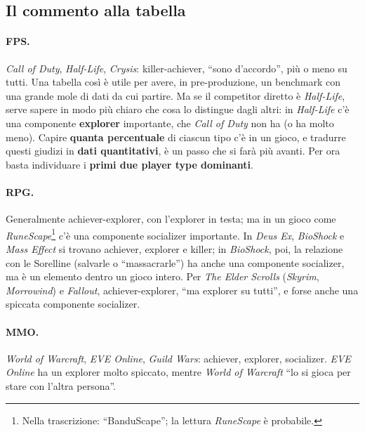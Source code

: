 \subsection{Il commento alla tabella}

\paragraph{FPS.} \emph{Call of Duty}, \emph{Half-Life}, \emph{Crysis}:
killer-achiever, ``sono d'accordo'', più o meno su tutti. Una tabella così è utile
per avere, in pre-produzione, un benchmark con una grande mole di dati da cui
partire. Ma se il competitor diretto è \emph{Half-Life}, serve sapere in modo più
chiaro che cosa lo distingue dagli altri: in \emph{Half-Life} c'è una componente
\textbf{explorer} importante, che \emph{Call of Duty} non ha (o ha molto meno).
Capire \textbf{quanta percentuale} di ciascun tipo c'è in un gioco, e tradurre questi
giudizi in \textbf{dati quantitativi}, è un passo che si farà più avanti. Per ora
basta individuare i \textbf{primi due player type dominanti}.

\paragraph{RPG.} Generalmente achiever-explorer, con l'explorer in testa; ma in un
gioco come \emph{RuneScape}\footnote{Nella trascrizione: ``BanduScape''; la lettura
\emph{RuneScape} è probabile.} c'è una componente socializer importante. In
\emph{Deus Ex}, \emph{BioShock} e \emph{Mass Effect} si trovano achiever, explorer e
killer; in \emph{BioShock}, poi, la relazione con le Sorelline (salvarle o
``massacrarle'') ha anche una componente socializer, ma è un elemento dentro un
gioco intero. Per \emph{The Elder Scrolls} (\emph{Skyrim}, \emph{Morrowind}) e
\emph{Fallout}, achiever-explorer, ``ma explorer su tutti'', e forse anche una
spiccata componente socializer.

\paragraph{MMO.} \emph{World of Warcraft}, \emph{EVE Online}, \emph{Guild Wars}:
achiever, explorer, socializer. \emph{EVE Online} ha un explorer molto spiccato,
mentre \emph{World of Warcraft} ``lo si gioca per stare con l'altra persona''.

